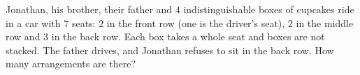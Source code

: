 Jonathan, his brother, their father and $4$ indistinguishable boxes of cupcakes ride in a car with $7$ seats: $2$ in the front row (one is the driver's seat), $2$ in the middle row and $3$ in the back row. Each box takes a whole seat and boxes are not stacked. The father drives, and Jonathan refuses to sit in the back row. How many arrangements are there?
